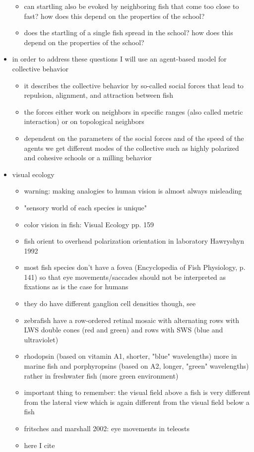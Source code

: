 \documentclass[a4paper,10pt,hidelinks]{scrreprt}
\begin{document}
\begin{itemize}
\begin{itemize}
		\item can startling also be evoked by neighboring fish that come too 
		close 
		to fast? how does this depend on the properties of the school?
		\item does the startling of a single fish spread in the school? how 
		does 
		this depend on the properties of the school?
		\end{itemize}
		\item in order to address these questions I will use an agent-based 
		model 
		for collective behavior
		\begin{itemize}
		\item it describes the collective behavior by so-called social forces 
		that 
		lead to repulsion, alignment, and attraction between fish
		\item the forces either work on neighbors in specific ranges (also 
		called 
		metric interaction) or on topological neighbors
		\item dependent on the parameters of the social forces and of the speed 
		of 
		the agents we get different modes of the collective such as highly 
		polarized and cohesive schools or a milling behavior \cite{Couzin2002}
		\end{itemize}
		\item visual ecology
		\begin{itemize}
			\item warning: making analogies to human vision is almost always misleading
			\item "sensory world of each species is unique"
			\item color vision in fish: Visual Ecology pp. 159
			\item fish orient to overhead polarization orientation in laboratory Hawryshyn 1992
			\item most fish species don't have a fovea (Encyclopedia of Fish 
			Physiology, p. 141) so that eye movements/saccades should not be 
			interpreted as fixations as is the case for humans
			\item they do have different ganglion cell densities though, see 
			\cite{Pita2015}
			\item zebrafish have a row-ordered retinal mosaic with alternating rows with LWS double cones (red and green) and rows with SWS (blue and ultraviolet)
			\item rhodopsin (based on vitamin A1, shorter, "blue" wavelengths) more in marine fish and porphyropsins (based on A2, longer, "green" wavelengths) rather in freshwater fish (more green environment)
			\item important thing to remember: the visual field above a fish is very different from the lateral view which is again different from the visual field below a fish
			\item fritsches and marshall 2002: eye movements in teleosts
			\item here I cite \cite{Tytell2008}
		\end{itemize}
	\end{itemize}
	\newpage
\end{document}
